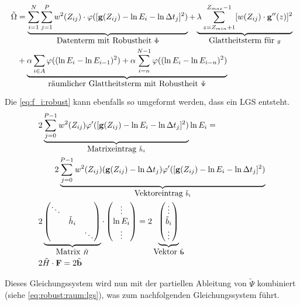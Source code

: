 \begin{align}
\tilde{\Omega} &= 
    \underbrace{\sum_{i=1}^{N} \sum_{j=1}^{P} w^2(Z_{ij})
    \cdot \varphi([\mathbf g(Z_{ij}) - \ln E_i - \ln \Delta t_j]^2)}_{\mbox{Datenterm mit Robustheit }\tilde{\Phi}}
    + \underbrace{\lambda  \sum_{z=Z_{min}+1}^{Z_{max}-1} [w(Z_{ij}) \cdot \mathbf g''(z)]^2}_{\mbox{Glattheitsterm für }g} \nonumber\\
    & + \underbrace{
        \alpha \sum_{i\in A}
            \varphi((\ln E_i - \ln E_{i-1})^2)
        +\alpha \sum_{i=n}^{N-1}\varphi((\ln E_i - \ln E_{i-n})^2)
    }_{\mbox{räumlicher Glattheitsterm mit Robustheit }\Tilde \Psi}
\\
\end{align}

Die \autoref{eq:f_i:robust} kann ebenfalls so umgeformt werden, dass ein LGS entsteht. 
\begin{align}
    & 2 \underbrace{
        \sum_{j=0}^{P-1} 
            w^2(Z_{ij})
            \varphi'(
                [\mathbf g(Z_{ij})-\ln E_i - \ln \Delta t_j]^2
            )
    }_{\mbox{Matrixeintrag }\tilde h_i}
    \ln E_i = \nonumber \\
    &\qquad 2 \underbrace{
        \sum_{j=0}^{P-1} 
            w^2(Z_{ij})
            (\mathbf g(Z_{ij})-\ln \Delta t_j)
            \varphi'(
                [\mathbf g(Z_{ij})-\ln E_i - \ln \Delta t_j]^2
            )
    }_{\mbox{Vektoreintrag } \tilde b_i}\\
    &
    2 \underbrace{
        \begin{pmatrix}
            \ddots & &\\
            & \tilde h_i & \\
            & & \ddots
        \end{pmatrix}
    }_{\mbox{Matrix }\tilde H}
    \cdot
    \begin{pmatrix}
        \vdots\\ \ln E_i \\ \vdots
    \end{pmatrix}
    =
    2 \underbrace{
        \begin{pmatrix}
            \vdots\\ \tilde b_i \\ \vdots    
        \end{pmatrix}
    }_{\mbox{Vektor }\tilde{\mathbf b}}\\
    & 2 \tilde H \cdot \mathbf F = 2 \tilde{\mathbf{b}}
\end{align}

Dieses Gleichungssystem wird nun mit der partiellen Ableitung von $\tilde \Psi$ kombiniert (siehe \autoref{eq:robust:raum:lgs}), was zum nachfolgenden Gleichungssystem führt.

